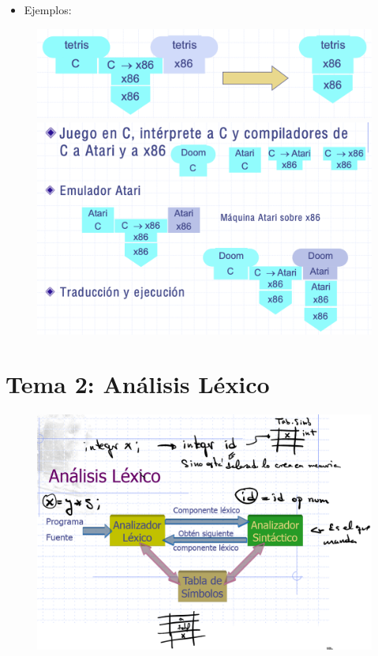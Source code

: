 \documentclass[12pt]{report} %
\begin{document}
\begin{itemize}
	\item
	  Ejemplos:
\end{itemize}

\begin{figure}[H]
	{\includegraphics[scale=.2]{Untitled 25.png}}
	{\includegraphics[scale=.2]{Untitled 26.png}}
\end{figure}

\chapter{Tema 2: Análisis Léxico}

\begin{figure}[H]
	{\includegraphics[scale=.25]{Untitled 27.png}}
\end{figure}
\end{document}
